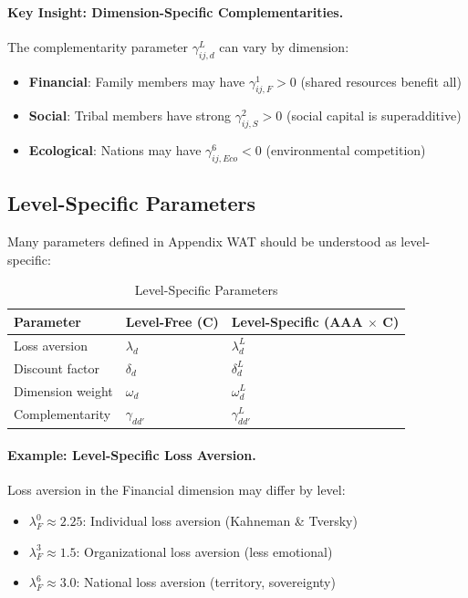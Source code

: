 \paragraph{Key Insight: Dimension-Specific Complementarities.}

The complementarity parameter $\gamma^L_{ij,d}$ can vary by dimension:

\begin{itemize}[nosep]
\item \textbf{Financial}: Family members may have $\gamma^1_{ij,F} > 0$ (shared resources benefit all)
\item \textbf{Social}: Tribal members have strong $\gamma^2_{ij,S} > 0$ (social capital is superadditive)
\item \textbf{Ecological}: Nations may have $\gamma^6_{ij,Eco} < 0$ (environmental competition)
\end{itemize}

\subsection{Level-Specific Parameters}

Many parameters defined in Appendix WAT should be understood as level-specific:

\begin{table}[htbp]
\centering
\caption{Level-Specific Parameters}
\label{tab:app-c-level-params}
\renewcommand{\arraystretch}{1.3}
\begin{tabular}{@{}lll@{}}
\toprule
\textbf{Parameter} & \textbf{Level-Free (C)} & \textbf{Level-Specific (AAA $\times$ C)} \\
\midrule
Loss aversion & $\lambda_d$ & $\lambda^L_d$ \\
Discount factor & $\delta_d$ & $\delta^L_d$ \\
Dimension weight & $\omega_d$ & $\omega^L_d$ \\
Complementarity & $\gamma_{dd'}$ & $\gamma^L_{dd'}$ \\
\bottomrule
\end{tabular}
\end{table}

\paragraph{Example: Level-Specific Loss Aversion.}

Loss aversion in the Financial dimension may differ by level:

\begin{itemize}[nosep]
\item $\lambda^0_F \approx 2.25$: Individual loss aversion (Kahneman \& Tversky)
\item $\lambda^3_F \approx 1.5$: Organizational loss aversion (less emotional)
\item $\lambda^6_F \approx 3.0$: National loss aversion (territory, sovereignty)
\end{itemize}

